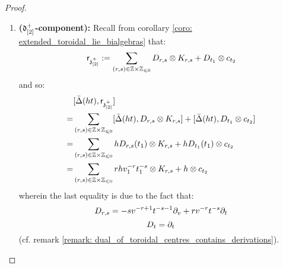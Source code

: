 \begin{proof}
\begin{enumerate}
\begin{enumerate}
                            \item \textbf{($\mathfrak{d}_{[2]}^+$-component):} Recall from corollary \ref{coro: extended_toroidal_lie_bialgebras} that:
                                $$\sfr_{\z_{[2]}^+} := \sum_{(r, s) \in \Z \x \Z_{\leq 0}} D_{r, s} \tensor K_{r, s} + D_{t_1} \tensor c_{t_2}$$
                            and so:
                                $$
                                    \begin{aligned}
                                        & [\bar{\Delta}(ht), \sfr_{\z_{[2]}^+}]
                                        \\
                                        = & \sum_{(r, s) \in \Z \x \Z_{\leq 0}} [\bar{\Delta}(ht), D_{r, s} \tensor K_{r, s}] + [\bar{\Delta}(ht), D_{t_1} \tensor c_{t_2}]
                                        \\
                                        = & \sum_{(r, s) \in \Z \x \Z_{\leq 0}} h D_{r, s}(t_1) \tensor K_{r, s} + h D_{t_1}(t_1) \tensor c_{t_2}
                                        \\
                                        = & \sum_{(r, s) \in \Z \x \Z_{\leq 0}} r h v_1^{-r} t_1^{-s} \tensor K_{r, s} + h \tensor c_{t_2}
                                    \end{aligned}
                                $$
                            wherein the last equality is due to the fact that:
                                $$D_{r, s} = -s v^{-r + 1} t^{-s - 1} \partial_v + r v^{-r} t^{-s} \partial_t$$
                                $$D_t = \partial_t$$
                            (cf. remark \ref{remark: dual_of_toroidal_centres_contains_derivations}). 
                        \end{enumerate}


\end{enumerate}
\end{proof}
